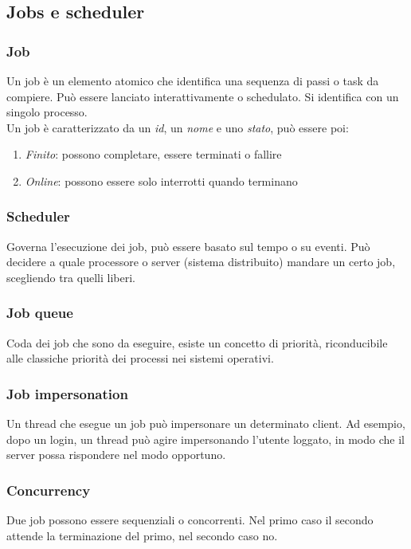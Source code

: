 \subsection{Jobs e scheduler}
\subsubsection{Job}
Un job è un elemento atomico che identifica una sequenza di passi o task da compiere. 
Può essere lanciato interattivamente o schedulato. Si identifica con 
un singolo processo.\\
Un job è caratterizzato da un \emph{id}, un \emph{nome} e uno \emph{stato}, può essere poi:
\begin{enumerate}
    \item \emph{Finito}: possono completare, essere terminati o fallire
    \item \emph{Online}: possono essere solo interrotti quando terminano
\end{enumerate}

\subsubsection{Scheduler}
Governa l'esecuzione dei job, può essere basato sul tempo o su eventi.
Può decidere a quale processore o server (sistema distribuito) mandare un certo job, scegliendo 
tra quelli liberi.

\subsubsection{Job queue}
Coda dei job che sono da eseguire, esiste un concetto di priorità, riconducibile alle classiche 
priorità dei processi nei sistemi operativi.

\subsubsection{Job impersonation}
Un thread che esegue un job può impersonare un determinato client.
Ad esempio, dopo un login, un thread può agire impersonando l'utente loggato, 
in modo che il server possa rispondere nel modo opportuno.

\subsubsection{Concurrency}
Due job possono essere sequenziali o concorrenti.
Nel primo caso il secondo attende la terminazione del primo, nel secondo caso no.